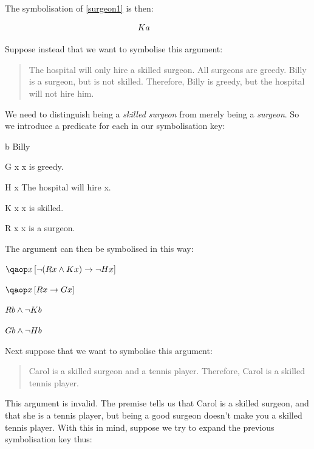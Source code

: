 \documentclass[PHIL101-Textbook.tex]{subfiles}
\begin{document}
\noindent The symbolisation of \ref{surgeon1} is then:

$$\atom K a\ \ \ \ \ \ \ \ \ \ $$

\vspace{-180pt}
\begin{flushright}
  \href{https://youtu.be/YaM44j5KF6s}
  {}
\end{flushright}
\pagebreak

\noindent Suppose instead that we want to symbolise this argument:
\begin{quote}
The hospital will only hire a skilled surgeon. All surgeons are greedy. Billy is a surgeon, but is not skilled. Therefore, Billy is greedy, but the hospital will not hire him.
\end{quote}
We need to distinguish being a \emph{skilled surgeon} from merely being a \emph{surgeon}. So we introduce a predicate for each in our symbolisation key:
\begin{ekey}
\item[b] Billy
\item[\atom G x] x is greedy.
\item[\atom H x ] The hospital will hire x.
\item[\atom K x ] x is skilled.
\item[\atom R x ] x is a surgeon.
\end{ekey}

\noindent The argument can then be symbolised in this way:
\begin{earg}
\label{surgeon2}
\item[] $\qab{x}{\enot (\atom R x  \eand \atom K x ) \eif \enot \atom H x }$
\item[] $\qab{x}{\atom R x  \eif \atom G x }$
\item[] $\mathord{R}{b} \land \neg \mathord{K}{b}$
\item[\therefore] $\mathord{G}{b} \land \neg \mathord{H}{b}$
\end{earg}

\noindent Next suppose that we want to symbolise this argument:
\begin{quote}
\label{surgeon3}
Carol is a skilled surgeon and a tennis player. Therefore, Carol is a skilled tennis player.
\end{quote}
\noindent This argument is invalid. The premise tells us that Carol is a skilled surgeon, and that she is a tennis player, but being a good surgeon doesn't make you a skilled tennis player. 
With this in mind, suppose we try to expand the previous symbolisation key thus:
\end{document}
